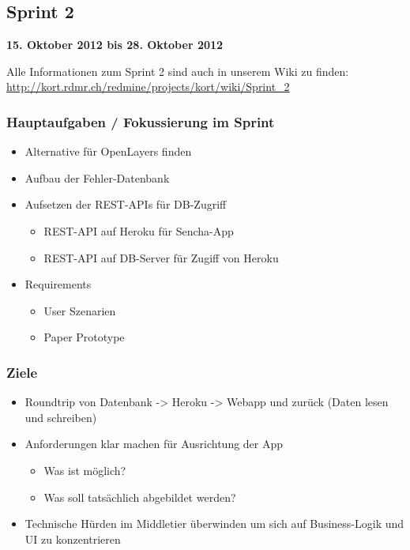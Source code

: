 \subsection{Sprint 2}

\textbf{15. Oktober 2012 bis 28. Oktober 2012}

Alle Informationen zum Sprint 2 sind auch in unserem Wiki zu finden:
\url{http://kort.rdmr.ch/redmine/projects/kort/wiki/Sprint_2}

\subsubsection{Hauptaufgaben / Fokussierung im Sprint}

\begin{itemize}
	\item Alternative für OpenLayers finden
	\item Aufbau der Fehler-Datenbank
	\item Aufsetzen der REST-APIs für DB-Zugriff
	\begin{itemize}
		\item REST-API auf Heroku für Sencha-App
		\item REST-API auf DB-Server für Zugiff von Heroku
	\end{itemize}
	\item Requirements
	\begin{itemize}
		\item User Szenarien
		\item Paper Prototype
	\end{itemize}
\end{itemize}

\subsubsection{Ziele}
\begin{itemize}
	\item Roundtrip von Datenbank -> Heroku -> Webapp und zurück (Daten lesen und schreiben)
	\item Anforderungen klar machen für Ausrichtung der App
	\begin{itemize}
		\item Was ist möglich?
		\item Was soll tatsächlich abgebildet werden?
	\end{itemize}
	\item Technische Hürden im Middletier überwinden um sich auf Business-Logik und UI zu konzentrieren
\end{itemize}

